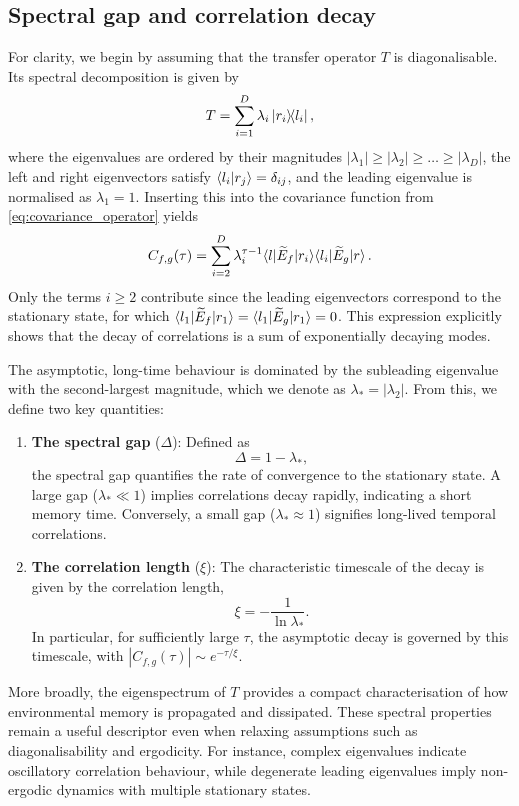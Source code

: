 \subsection{Spectral gap and correlation decay}\label{sec:spectral-analysis}
For clarity, we begin by assuming that the transfer operator \(T\) is diagonalisable. Its spectral decomposition is given by
\begin{equation}
    T = \sum_{i=1}^{D} \lambda_i \ket{r_i}\!\!\bra{l_i},
\end{equation}
where the eigenvalues are ordered by their magnitudes \(|\lambda_1| \geq |\lambda_2| \geq \dots \geq |\lambda_{D}|\), the left and right eigenvectors satisfy \(\braket{l_i|r_j} = \delta_{ij}\), and the leading eigenvalue is normalised as \(\lambda_1 = 1\). Inserting this into the covariance function from \cref{eq:covariance_operator} yields
\begin{equation}\label{eq:covariance-spectral-expansion}
    C_{f,g}(\tau) = \sum_{i=2}^{D} \lambda_i^{\tau - 1} \! \braket{l|\widetilde{E}_f|r_i} \! \braket{l_i|\widetilde{E}_g|r}.
\end{equation}
Only the terms \(i \geq 2\) contribute since the leading eigenvectors correspond to the stationary state, for which \(\braket{l_1|\widetilde{E}_f|r_1} = \braket{l_1|\widetilde{E}_g|r_1} = 0\). This expression explicitly shows that the decay of correlations is a sum of exponentially decaying modes.

The asymptotic, long-time behaviour is dominated by the subleading eigenvalue with the second-largest magnitude, which we denote as \(\lambda_* = |\lambda_2|\). From this, we define two key quantities:
\begin{enumerate}
    \item \textbf{The spectral gap} (\(\Delta\)): Defined as 
    \begin{equation}
        \Delta = 1 - \lambda_*,
    \end{equation}
    the spectral gap quantifies the rate of convergence to the stationary state. A large gap (\(\lambda_* \ll 1\)) implies correlations decay rapidly, indicating a short memory time. Conversely, a small gap (\(\lambda_* \approx 1\)) signifies long-lived temporal correlations.
    \item \textbf{The correlation length} (\(\xi\)): The characteristic timescale of the decay is given by the correlation length,
    \begin{equation}
        \xi = -\frac{1}{\ln \lambda_*}.
    \end{equation}
    In particular, for sufficiently large \(\tau\), the asymptotic decay is governed by this timescale, with \(|C_{f,g}(\tau)| \sim e^{-\tau/\xi}\).
\end{enumerate}
More broadly, the eigenspectrum of \(T\) provides a compact characterisation of how environmental memory is propagated and dissipated. These spectral properties remain a useful descriptor even when relaxing assumptions such as diagonalisability and ergodicity. For instance, complex eigenvalues indicate oscillatory correlation behaviour, while degenerate leading eigenvalues imply non-ergodic dynamics with multiple stationary states.

